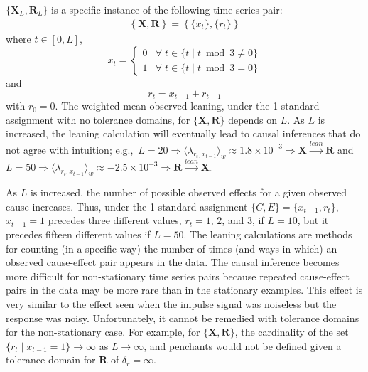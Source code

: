 \documentclass[twocolumn,aps,pre,groupedaddress]{revtex4-1}
\begin{document}
$\{\mathbf{X}_L,\mathbf{R}_L\}$ is a specific instance of the following time series pair:
\begin{eqnarray}
\left\{\mathbf{X},\mathbf{R}\right\} = \left\{\{x_t\},\{r_t\}\right\}
\end{eqnarray}
where $t\in[0,L]$,
\begin{equation}
x_t = \left\{
  \begin{array}{lr}
    0 & \forall\; t\in\{t\;|\;t\bmod 3 \neq 0\}\\
    1 & \forall\; t\in\{t\;|\;t\bmod 3 = 0\}
  \end{array}
\right.
\end{equation}
and
\begin{equation}
r_t = x_{t-1}+r_{t-1}
\end{equation}
with $r_0 = 0$.  The weighted mean observed leaning, under the 1-standard assignment with no tolerance domains, for $\{\mathbf{X},\mathbf{R}\}$ depends on $L$.  As $L$ is increased, the leaning calculation will eventually lead to causal inferences that do not agree with intuition; e.g.,\ $L = 20 \Rightarrow \langle \lambda_{r_t,x_{t-1}} \rangle_w \approx 1.8\times10^{-3} \Rightarrow \mathbf{X}\xrightarrow{lean}\mathbf{R}$ and $L = 50 \Rightarrow \langle \lambda_{r_t,x_{t-1}} \rangle_w \approx -2.5\times10^{-3} \Rightarrow \mathbf{R}\xrightarrow{lean}\mathbf{X}$.  

As $L$ is increased, the number of possible observed effects for a given observed cause increases.  Thus, under the 1-standard assignment $\{C,E\} = \{x_{t-1},r_t\}$, $x_{t-1}=1$ precedes three different values, $r_t = 1$, $2$, and $3$, if $L=10$, but it precedes fifteen different values if $L=50$.  The leaning calculations are methods for counting (in a specific way) the number of times (and ways in which) an observed cause-effect pair appears in the data.  The causal inference becomes more difficult for non-stationary time series pairs because repeated cause-effect pairs in the data may be more rare than in the stationary examples.  This effect is very similar to the effect seen when the impulse signal was noiseless but the response was noisy.  Unfortunately, it cannot be remedied with tolerance domains for the non-stationary case.  For example, for $\{\mathbf{X},\mathbf{R}\}$, the cardinality of the set $\{r_t\;|\;x_{t-1}=1\}\rightarrow\infty$ as $L\rightarrow\infty$, and penchants would not be defined given a tolerance domain for $\mathbf{R}$ of $\delta_r=\infty$.
\end{document}
